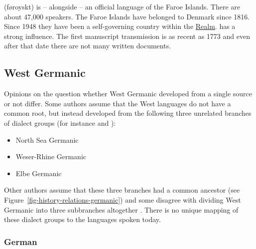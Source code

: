  (føroyskt) is -- alongside  -- an official language of the Faroe Islands. There
are about 47,000 speakers. The Faroe Islands have belonged to Denmark since 1816. Since 1948 they
have been a self-governing country within the \href{https://en.wikipedia.org/wiki/Danish_Realm}{ Realm}.
 has a strong  influence. The first manuscript transmission is as recent as 1773 and
even after that date there are not many written documents.%

\subsection{West Germanic}


Opinions on the question whether West Germanic developed from a single source or not differ. Some authors
assume that the West  languages do not have a common root, but instead developed from the
following three unrelated branches of dialect groups (for instance \citealp[--18]{Robinson1992a-u} and
\citealp[]{HvDA94a}):
\begin{itemize}
\item North Sea Germanic %
\item Weser-Rhine Germanic %
\item Elbe Germanic %
\end{itemize}
Other authors assume that these three branches had a common ancestor (see
Figure~\ref{fig-history-relations-germanic}) and some disagree with dividing West Germanic into
three subbranches altogether \citep{Stiles2013a-u}.
There is no unique mapping of these dialect groups to the languages spoken today.%

\largerpage
\subsubsection{German}

